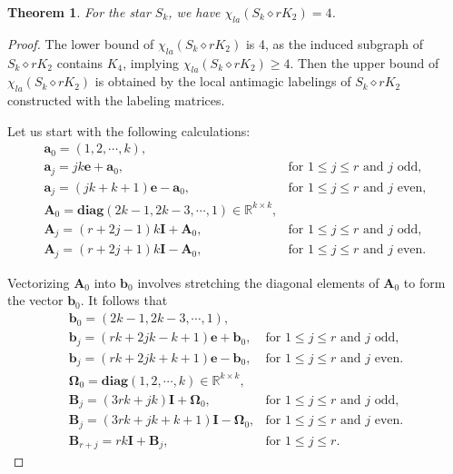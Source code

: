 \documentclass[12pt]{article}
\newtheorem{theorem}{Theorem}[section]
\begin{document}
\begin{theorem}\label{The-31}
For the star $S_{k}$, we have $\chi_{la}(S_{k}\diamond rK_{2})=4$.
\end{theorem}

\begin{proof}
The lower bound of $\chi_{la}(S_{k}\diamond rK_{2})$ is 4, as the induced subgraph of $S_{k}\diamond rK_{2}$ contains $K_4$, implying $\chi_{la}(S_{k}\diamond rK_{2})\geq 4$. Then the upper bound of $\chi_{la}(S_{k}\diamond rK_{2})$ is obtained by the local antimagic labelings of $S_{k}\diamond rK_{2}$ constructed with the labeling matrices.

Let us start with the following calculations:
\begin{equation}\label{sk2-1}
\begin{array}{ll}
\boldsymbol{a}_{0}=(1,2,\cdots,k),\\
\boldsymbol{a}_{j}=jk\boldsymbol{e}+\boldsymbol{a}_{0}, & \text{for $1\leq j\leq r$ and $j$ odd},\\[4pt]
\boldsymbol{a}_{j}=(jk+k+1)\boldsymbol{e}-\boldsymbol{a}_{0}, & \text{for $1\leq j\leq r$ and $j$ even},\\[6pt]
\boldsymbol{A}_{0}=\mathrm{\textbf{diag}}(2k-1,2k-3,\cdots,1)\in \mathbb{R}^{k\times k},\\[4pt]
\boldsymbol{A}_{j}=(r+2j-1)k\boldsymbol{I}+\boldsymbol{A}_{0}, &\text{for $1\leq j\leq r$ and $j$ odd},\\[4pt]
\boldsymbol{A}_{j}=(r+2j+1)k\boldsymbol{I}-\boldsymbol{A}_{0}, & \text{for $1\leq j\leq r$ and $j$ even}.
\end{array}
\end{equation}

Vectorizing $\boldsymbol{A}_{0}$ into $\boldsymbol{b}_{0}$ involves stretching the diagonal elements of $\boldsymbol{A}_{0}$ to form the vector $\boldsymbol{b}_{0}$. It follows that
\begin{equation}\label{sk2-2}
\begin{array}{ll}
\boldsymbol{b}_{0}=(2k-1,2k-3,\cdots,1),\\[2pt]
\boldsymbol{b}_{j}=(rk+2jk-k+1)\boldsymbol{e}+\boldsymbol{b}_{0}, &\text{for $1\leq j\leq r$ and $j$ odd},\\[4pt]
\boldsymbol{b}_{j}=(rk+2jk+k+1)\boldsymbol{e}-\boldsymbol{b}_{0}, & \text{for $1\leq j\leq r$ and $j$ even}.\\[4pt]
\boldsymbol{\Omega}_{0}=\mathrm{\textbf{diag}}(1,2,\cdots,k)\in \mathbb{R}^{k\times k},\\[2pt]
\boldsymbol{B}_{j}=(3rk+jk)\boldsymbol{I}+\boldsymbol{\Omega}_{0}, & \text{for $1\leq j\leq r$ and $j$ odd},\\[4pt]
\boldsymbol{B}_{j}=(3rk+jk+k+1)\boldsymbol{I}-\boldsymbol{\Omega}_{0}, & \text{for $1\leq j\leq r$ and $j$ even}.\\[4pt]
\boldsymbol{B}_{r+j}=rk\boldsymbol{I}+\boldsymbol{B}_{j}, &\text{for $1\leq j\leq r$}.
\end{array}
\end{equation}


\end{proof}
\end{document}
